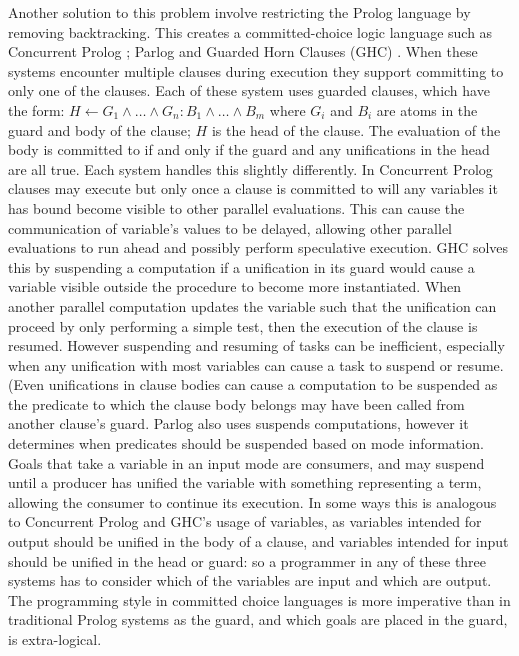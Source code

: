 Another solution to this problem involve restricting the Prolog language
by removing backtracking.
This creates a committed-choice logic language such as
Concurrent Prolog \citep{saraswat86:concurrent_prolog_definition,
shapiro:flat_concur_prolog};
Parlog \citep{clark:84:parlog_sys_prog,clark:86:parlog}
and Guarded Horn Clauses (GHC) \citep{ueda:ghc}.
When these systems encounter multiple clauses during execution they support
committing to only one of the clauses.
Each of these system uses guarded clauses, which have the
form:
$H \leftarrow G_1 \wedge \ldots \wedge G_n : B_1 \wedge \ldots \wedge B_m$
where $G_i$ and $B_i$ are atoms in the guard and body of the
clause;
$H$ is the head of the clause.
The evaluation of the body is committed to if and only if the guard and any
unifications in the head are all true.
Each system handles this slightly differently.
In Concurrent Prolog clauses may execute but only once a clause is committed
to will any variables it has bound become visible to other parallel
evaluations.
This can cause the communication of variable's values to be delayed,
allowing other parallel evaluations to run ahead and possibly perform
speculative execution.
GHC solves this by suspending a computation if a unification in its guard
would cause a variable visible outside the procedure to become more
instantiated.
When another parallel computation updates the variable such that the
unification can proceed by only performing a simple test,
then the execution of the clause is resumed.
However suspending and resuming of tasks can be inefficient,
especially when any unification with most variables can cause a task to
suspend or resume.
(Even unifications in clause bodies can cause a computation to be suspended
as the predicate to which the clause body belongs may have been called from
another clause's guard.
Parlog also uses suspends computations,
however it determines when predicates should be suspended based on mode
information.
Goals that take a variable in an input mode are consumers, and may suspend
until a producer has unified the variable with something representing a
term, allowing the consumer to continue its execution.
In some ways this is analogous to Concurrent Prolog and GHC's usage of
variables,
as variables intended for output should be unified in the body of a clause,
and variables intended for input should be unified in the head or guard:
so a programmer in any of these three systems has to consider which of the
variables are input and which are output.
The programming style in committed choice languages is more imperative than
in traditional Prolog systems as the guard, and which goals are placed in
the guard, is extra-logical.

